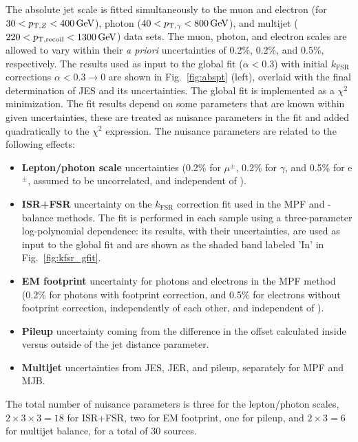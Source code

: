 \documentclass[11pt,twoside,a4paper,cmspaper,final,collab]{cms-tdr}
\begin{document}
The absolute jet \pt scale is fitted simultaneously to the muon and electron (for $30<p_{\mathrm{T},Z}<400\,\text{Ge\hspace{-.08em}V}$), photon ($40<p_{\mathrm{T},\gamma}<800\,\text{Ge\hspace{-.08em}V}$), and multijet ($220<p_{\mathrm{T},\rm recoil}<1300\,\text{Ge\hspace{-.08em}V}$) data sets. The muon, photon, and electron scales are allowed to vary within their \textit{a priori} uncertainties of 0.2\%, 0.2\%, and 0.5\%, respectively.
The results used as input to the global fit ($\alpha<0.3$) with initial $k_\mathrm{FSR}$ corrections $\alpha<0.3\to0$ are shown in Fig.~\ref{fig:abspt} (left), overlaid with the final determination of JES and its uncertainties.
The global fit is implemented as a $\chi^2$ minimization.  The fit results depend on some parameters that are known within given uncertainties, these are treated as nuisance parameters in the fit and added quadratically to the $\chi^2$ expression. The nuisance parameters are related to the following effects:
\begin{itemize}
\item \textbf{Lepton/photon scale} uncertainties (0.2\% for $\mu^{\pm}$, 0.2\% for $\gamma$, and 0.5\% for e$^\pm$, assumed to be uncorrelated, and independent of \pt).
\item \textbf{ISR+FSR} uncertainty on the $k_\mathrm{FSR}$ correction fit used in the MPF and \pt-balance methods. The fit is performed in each sample using a three-parameter log-polynomial \pt dependence: its results, with their uncertainties, are used as input to the global fit and are shown as the shaded band labeled 'In' in Fig.~\ref{fig:kfsr_gfit}.
\item \textbf{EM footprint} uncertainty for photons and electrons in the MPF method (0.2\% for photons with footprint correction, and 0.5\% for electrons without footprint correction, independently of each other, and independent of \pt).
\item \textbf{Pileup} uncertainty coming from the difference in the offset calculated inside versus outside of the jet distance parameter.
\item \textbf{Multijet} uncertainties from JES, JER, and pileup, separately for MPF and MJB.
\end{itemize}
The total number of nuisance parameters is three for the lepton/photon scales, $2\times3\times 3=18$ for ISR+FSR, two for EM footprint, one for pileup, and $2\times 3=6$ for multijet balance, for a total of 30 sources.
\end{document}
